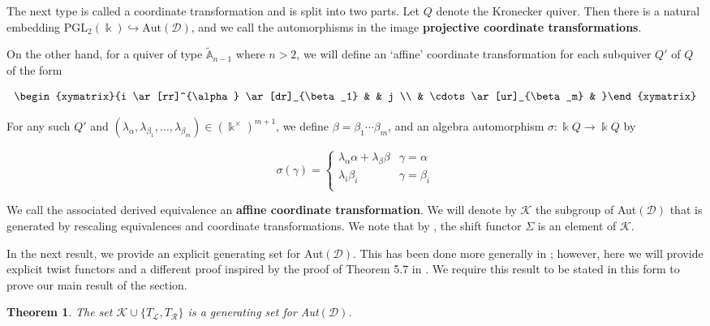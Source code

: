 \documentclass[12pt]{amsart}
\theoremstyle{plain}
\newtheorem{thm}{Theorem}[section]
\theoremstyle{definition}
\theoremstyle{remark}
\begin{document}
The next type is called a coordinate transformation and is split into two parts. Let $Q$ denote the Kronecker quiver. Then there is a natural embedding $\text{PGL}_2(\Bbbk) \hookrightarrow \text{Aut}(\mathscr{D})$, and we call the automorphisms in the image \textbf{projective coordinate transformations}. 

On the other hand, for a quiver of type $\tilde{\mathbb{A}}_{n-1}$ where $n >2$, we will define an `affine' coordinate transformation for each subquiver $Q'$ of $Q$ of the form

\[ \begin{xymatrix}{i \ar[rr]^{\alpha} \ar[dr]_{\beta_1} & & j \\ & \cdots \ar[ur]_{\beta_m} & }\end{xymatrix}\]

For any such $Q'$ and $(\lambda_{\alpha}, \lambda_{\beta_1}, \dots, \lambda_{\beta_m})\in (\Bbbk^{\times})^{m+1}$, we define {\color{black} $\beta = \beta_1\cdots\beta_m$,} and an algebra automorphism $\sigma: \Bbbk Q \rightarrow \Bbbk Q$ by

\[ \sigma(\gamma) = \begin{cases} 
      \lambda_{\alpha}\alpha + \lambda_{\beta}\beta & \gamma = \alpha \\
      \lambda_i\beta_i & \gamma = \beta_i \\
   \end{cases}
\]

We call the associated derived equivalence an \textbf{affine coordinate transformation}. We will denote by $\mathscr{K}$ the subgroup of Aut$(\mathscr{D})$ that is generated by rescaling equivalences and coordinate transformations. We note that by \cite[Lemma 5.2]{opper2019auto}, the shift functor $\Sigma$ is an element of $\mathscr{K}$. 

In the next result, we provide an explicit generating set for Aut$(\mathscr{D})$. This has been done more generally in \cite{opper2019auto}; however, here we will provide explicit twist functors and a different proof inspired by the proof of Theorem 5.7 in \cite{broomhead2017discrete}. We require this result to be stated in this form to prove our main result of the section.

\begin{thm}\label{thm: gen set for derived}
The set $\mathscr{K} \cup \{T_{\mathscr{L}}, T_{\mathscr{R}}\}$ is a generating set for Aut$(\mathscr{D})$.
\end{thm}
\end{document}
